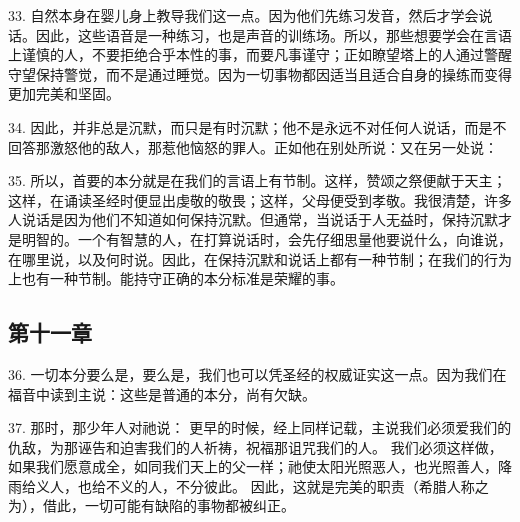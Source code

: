 33. 自然本身在婴儿身上教导我们这一点。因为他们先练习发音，然后才学会说话。因此，这些语音是一种练习，也是声音的训练场。所以，那些想要学会在言语上谨慎的人，不要拒绝合乎本性的事，而要凡事谨守；正如瞭望塔上的人通过警醒守望保持警觉，而不是通过睡觉。因为一切事物都因适当且适合自身的操练而变得更加完美和坚固。\par

34. 因此，并非总是沉默，而只是有时沉默；他不是永远不对任何人说话，而是不回答那激怒他的敌人，那惹他恼怒的罪人。正如他在别处所说：又在另一处说：\par

35. 所以，首要的本分就是在我们的言语上有节制。这样，赞颂之祭便献于天主；这样，在诵读圣经时便显出虔敬的敬畏；这样，父母便受到孝敬。我很清楚，许多人说话是因为他们不知道如何保持沉默。但通常，当说话于人无益时，保持沉默才是明智的。一个有智慧的人，在打算说话时，会先仔细思量他要说什么，向谁说，在哪里说，以及何时说。因此，在保持沉默和说话上都有一种节制；在我们的行为上也有一种节制。能持守正确的本分标准是荣耀的事。\par


\subsection{第十一章}

\par

36. 一切本分要么是，要么是，我们也可以凭圣经的权威证实这一点。因为我们在福音中读到主说：这些是普通的本分，尚有欠缺。\par

37. 那时，那少年人对祂说： 更早的时候，经上同样记载，主说我们必须爱我们的仇敌，为那诬告和迫害我们的人祈祷，祝福那诅咒我们的人。 我们必须这样做，如果我们愿意成全，如同我们天上的父一样；祂使太阳光照恶人，也光照善人，降雨给义人，也给不义的人，不分彼此。 因此，这就是完美的职责（希腊人称之为），借此，一切可能有缺陷的事物都被纠正。\par

